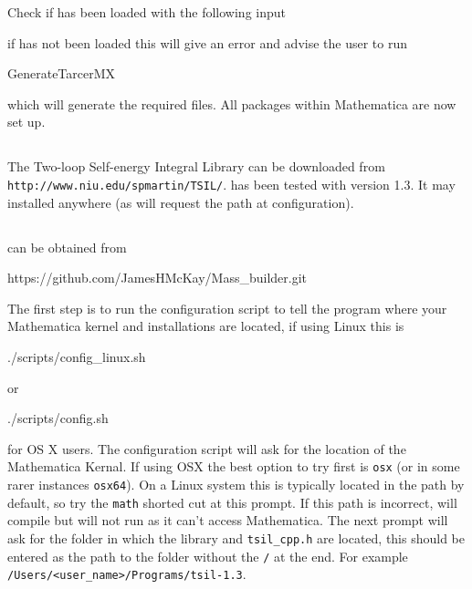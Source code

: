 Check if \tarcer has been loaded with the following input
if \tarcer has not been loaded this will give an error and advise the user to run
\begin{lstterm}
GenerateTarcerMX
\end{lstterm}
which will generate the required files.  All packages within Mathematica are now set up.

\subsection{\tsil}
The Two-loop Self-energy Integral Library can be downloaded from \lstinline{http://www.niu.edu/spmartin/TSIL/}.  \mb has been tested with version 1.3. It may installed anywhere (as \mb will request the path at configuration).

\subsection{\mb}
\mb can be obtained from

\begin{lstterm}
https://github.com/JamesHMcKay/Mass_builder.git
\end{lstterm}

The first step is to run the configuration script to tell the program where your Mathematica kernel and \tsil installations are located, if using Linux this is
\begin{lstterm}
./scripts/config_linux.sh
\end{lstterm}
or
\begin{lstterm}
./scripts/config.sh
\end{lstterm}
for OS X users.  The configuration script will ask for the location of the Mathematica Kernal.  If using OSX the best option to try first is \lstinline{osx} (or in some rarer instances \lstinline{osx64}).  On a Linux system this is typically located in the path by default, so try the \lstinline{math} shorted cut at this prompt.  If this path is incorrect, \mb will compile but will not run as it can't access Mathematica.  The next prompt will ask for the folder in which the \tsil library and \lstinline{tsil_cpp.h} are located, this should be entered as the path to the folder without the \lstinline{/} at the end.  For example \lstinline{/Users/<user_name>/Programs/tsil-1.3}.

